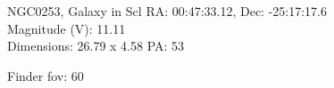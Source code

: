 \begin{block}{NGC0253, Galaxy in Scl}
    RA: 00:47:33.12, Dec: -25:17:17.6 \\ 
    Magnitude (V): 11.11 \\ 
    Dimensions: 26.79 x 4.58 PA: 53 

    Finder fov: 60 
\end{block}